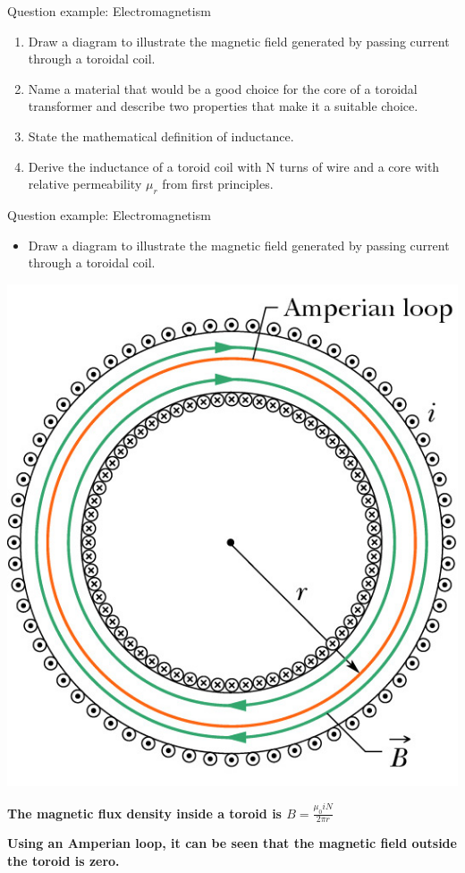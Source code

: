 \documentclass[compress]{beamer}
\begin{document}
\begin{frame}{Question example: Electromagnetism}

    \begin{enumerate}
        \item<1-> Draw a diagram to illustrate the magnetic field generated by
            passing current through a toroidal coil.
        \item<2-> Name a material that would be a good choice
            for the core of a toroidal transformer and describe two properties
            that make it a suitable choice.
        \item<3-> State the mathematical definition of inductance.
        \item<4-> Derive the inductance of a toroid coil with N turns of wire and a
            core with relative permeability $\mu_r$ from first principles.
    \end{enumerate}

\end{frame}


\begin{frame}{Question example: Electromagnetism}

    \begin{itemize}
        \item Draw a diagram to illustrate the magnetic field generated by
            passing current through a toroidal coil.
    \end{itemize}
    

    \begin{center}
        \includegraphics[width=0.3\linewidth]{toroid}
    \end{center}

    \textbf{The magnetic flux density inside a toroid is $B=\frac{\mu_0 i N}{2\pi
    r}$}

    \textbf{Using an Amperian loop, it can be seen that the magnetic field
    outside the toroid is zero.}


\end{frame}
\end{document}
